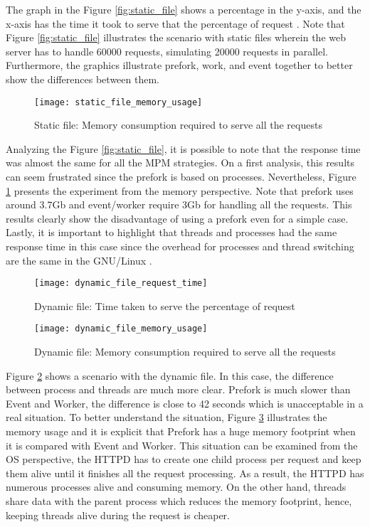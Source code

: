 The graph in the Figure \ref{fig:static_file} shows a percentage in the y-axis,
and the x-axis has the time it took to serve that the percentage of request
\cite{apache_ab}. Note that Figure \ref{fig:static_file} illustrates the
scenario with static files wherein the web server has to handle 60000 requests,
simulating 20000 requests in parallel. Furthermore, the graphics illustrate
prefork, work, and event together to better show the differences between them.

\begin{figure}[!h]
  \centering
  \texttt{[image: static\_file\_memory\_usage]}
  \caption{Static file: Memory consumption required to serve all the requests}
  \label{fig:static_file_memory}
\end{figure}
 
Analyzing the Figure \ref{fig:static_file}, it is possible to note that the
response time was almost the same for all the MPM strategies. On a first
analysis,  this results can seem frustrated since the prefork is based on
processes. Nevertheless, Figure \ref{fig:static_file_memory} presents the
experiment from the memory perspective. Note that prefork uses around 3.7Gb and
event/worker require 3Gb for handling all the requests. This results clearly
show the disadvantage of using a prefork even for a simple case. Lastly, it is
important to highlight that threads and processes had the same response time in
this case since the overhead for processes and thread switching are the same in
the GNU/Linux \cite{linux_kernel_development}.

\begin{figure}[!h]
  \centering
  \texttt{[image: dynamic\_file\_request\_time]}
  \caption{Dynamic file: Time taken to serve the percentage of request}
  \label{fig:dynamic_file}
\end{figure}

\begin{figure}[!h]
  \centering
  \texttt{[image: dynamic\_file\_memory\_usage]}
  \caption{Dynamic file: Memory consumption required to serve all the requests}
  \label{fig:dynamic_file_memory}
\end{figure}

Figure \ref{fig:dynamic_file} shows a scenario with the dynamic file. In this
case, the difference between process and threads are much more clear. Prefork
is much slower than Event and Worker, the difference is close to 42 seconds
which is unacceptable in a real situation. To better understand the situation,
Figure \ref{fig:dynamic_file_memory} illustrates the memory usage and it is
explicit that Prefork has a huge memory footprint when it is compared with
Event and Worker. This situation can be examined from the OS perspective, the
HTTPD has to create one child process per request and keep them alive until it
finishes all the request processing. As a result, the HTTPD has numerous
processes alive and consuming memory. On the other hand, threads share data
with the parent process which reduces the memory footprint, hence, keeping
threads alive during the request is cheaper.

